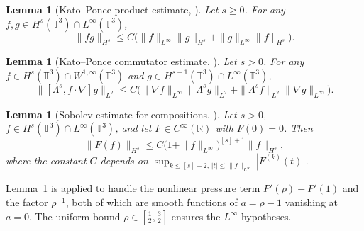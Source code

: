 \documentclass[12pt, reqno]{amsart}
\numberwithin{equation}{section}
\numberwithin{equation}{section}
\numberwithin{equation}{section}
\newtheorem{lemma}[theorem]{Lemma}
\numberwithin{equation}{section}
\theoremstyle{remark}
\begin{document}
\begin{lemma}[Kato--Ponce product estimate, {\cite{kato}}]
	\label{Hk-estimate}
	Let $s\geq 0$.  For any
	$f,g\in H^s(\mathbb{T}^3)\cap L^\infty(\mathbb{T}^3)$,
	\begin{equation}\label{KP-product}
		\|fg\|_{H^s}
		\leq C\bigl(\|f\|_{L^\infty}\|g\|_{H^s}
		+ \|g\|_{L^\infty}\|f\|_{H^s}\bigr).
	\end{equation}
\end{lemma}

\begin{lemma}[Kato--Ponce commutator estimate, {\cite{kato}}]
	\label{Hk-estimate-7-8}
	Let $s>0$.  For any
	$f\in H^s(\mathbb{T}^3)\cap W^{1,\infty}(\mathbb{T}^3)$ and
	$g\in H^{s-1}(\mathbb{T}^3)\cap L^\infty(\mathbb{T}^3)$,
	\begin{equation}\label{KP-commutator}
		\|[\Lambda^s, f\cdot\nabla]g\|_{L^2}
		\leq C\bigl(\|\nabla f\|_{L^\infty}\|\Lambda^s g\|_{L^2}
		+ \|\Lambda^s f\|_{L^2}\|\nabla g\|_{L^\infty}\bigr).
	\end{equation}
\end{lemma}

\begin{lemma}[Sobolev estimate for compositions, {\cite{Triebel}}]
	\label{Hk-estimate-1}
	Let $s>0$, $f\in H^s(\mathbb{T}^3)\cap L^\infty(\mathbb{T}^3)$, and
	let $F\in C^\infty(\mathbb{R})$ with $F(0)=0$.  Then
	\begin{equation}\label{composition}
		\|F(f)\|_{H^s}
		\leq C\bigl(1+\|f\|_{L^\infty}\bigr)^{[s]+1}\|f\|_{H^s},
	\end{equation}
	where the constant $C$ depends on
	$\sup_{k\leq[s]+2,\,|t|\leq\|f\|_{L^\infty}}|F^{(k)}(t)|$.
\end{lemma}

	Lemma~\ref{Hk-estimate-1} is applied
	to handle the nonlinear pressure term $P'(\rho)-P'(1)$ and the factor
	$\rho^{-1}$, both of which are smooth functions of $a=\rho-1$ vanishing
	at $a=0$.  The uniform bound $\rho\in[\frac{1}{2},\frac32]$
	ensures the $L^\infty$ hypotheses.


\end{document}
